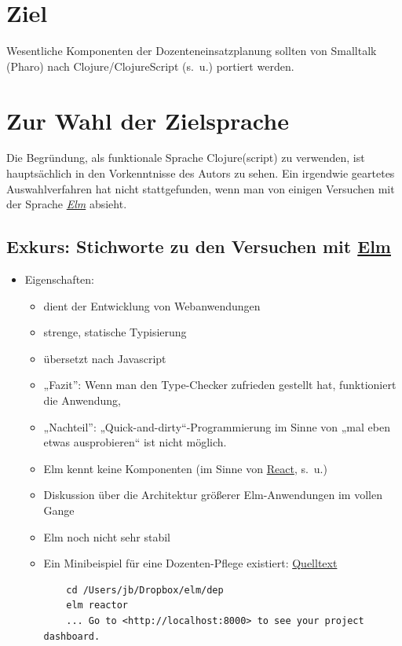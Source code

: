 \documentclass[11pt]{article}
\begin{document}
\section*{Ziel}
\label{sec:org137cd80}
Wesentliche Komponenten der Dozenteneinsatzplanung sollten von
Smalltalk (Pharo) nach Clojure/ClojureScript (s.~u.) portiert werden.
\section*{Zur Wahl der Zielsprache}
\label{sec:org4f74e09}
Die Begründung, als funktionale Sprache Clojure(script) zu verwenden,
ist hauptsächlich in den Vorkenntnisse des Autors zu sehen. Ein
irgendwie geartetes Auswahlverfahren hat nicht stattgefunden, wenn man
von einigen Versuchen mit der Sprache \emph{\href{https://elm-lang.org}{Elm}} absieht.
\subsection*{Exkurs: Stichworte zu den Versuchen mit \href{https://elm-lang.org}{Elm}}
\label{sec:orga462a3a}
\begin{itemize}
\item Eigenschaften:
\begin{itemize}
\item dient der Entwicklung von Webanwendungen
\item strenge, statische Typisierung
\item übersetzt nach Javascript
\item „Fazit”: Wenn man den Type-Checker zufrieden gestellt hat,
funktioniert die Anwendung,
\item „Nachteil”: „Quick-and-dirty“-Programmierung im Sinne von „mal eben
etwas ausprobieren“ ist nicht möglich.
\item Elm kennt keine Komponenten (im Sinne von \href{https://reactjs.org}{React}, s.~u.)
\item Diskussion über die Architektur größerer Elm-Anwendungen im vollen Gange
\item Elm noch nicht sehr stabil
\item Ein Minibeispiel für eine Dozenten-Pflege existiert: \href{./Dozent-V0.elm}{Quelltext}
\begin{verbatim}
    cd /Users/jb/Dropbox/elm/dep 
    elm reactor
    ... Go to <http://localhost:8000> to see your project dashboard.
\end{verbatim}
\end{itemize}
\end{itemize}
\end{document}
